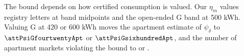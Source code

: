The bound depends on how certified consumption is valued. Our $\eta_m$ values registry letters at band midpoints and the open-ended G band at 500 kWh. Valuing G at 420 or 600 kWh moves the apartment estimate of $\psi_\delta$ to $\attPsiGfourtwentyApt$ or $\attPsiGsixhundredApt$, and the number of apartment markets violating the bound to \attNViolGfourtwentyApt{} or \attNViolGsixhundredApt. %
